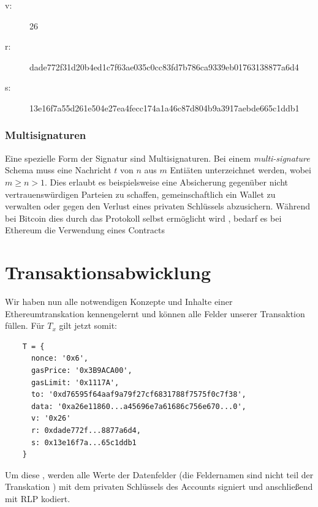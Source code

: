 \documentclass[runningheads]{llncs}
\begin{document}
\begin{description}
  \item[v:] 26
  \item [r:] dade772f31d20b4ed1c7f63ae035c0cc83fd7b786ca9339eb01763138877a6d4
  \item[s:] 13e16f7a55d261e504e27ea4fecc174a1a46c87d804b9a3917aebde665c1ddb1
\end{description}

\subsubsection{Multisignaturen}
Eine spezielle Form der Signatur sind Multisignaturen. Bei einem \textit{multi-signature} Schema muss eine Nachricht $ t $ von $ n $ aus $ m $ Entiäten unterzeichnet werden, wobei $ m \geq n > 1 $. \cite[S. 2]{hutchison_identity-based_2006} Dies erlaubt es beispielsweise eine Absicherung gegenüber nicht vertrauenswürdigen Parteien zu schaffen, gemeinschaftlich ein Wallet zu verwalten oder gegen den Verlust eines privaten Schlüssels abzusichern. Während bei Bitcoin dies durch das Protokoll selbst ermöglicht wird \cite{noauthor_multisignature_nodate}, bedarf es bei Ethereum die Verwendung eines Contracts \cite{noauthor_frequently_nodate}


\section{Transaktionsabwicklung}
Wir haben nun alle notwendigen Konzepte und Inhalte einer Ethereumtranskation kennengelernt und können alle Felder unserer Transaktion füllen. Für $T_x$ gilt jetzt somit:
\begin{center}
  \begin{verbatim}
    T = { 
      nonce: '0x6',
      gasPrice: '0x3B9ACA00',
      gasLimit: '0x1117A',
      to: '0xd76595f64aaf9a79f27cf6831788f7575f0c7f38',
      data: '0xa26e11860...a45696e7a61686c756e670...0',
      v: '0x26'
      r: 0xdade772f...8877a6d4,
      s: 0x13e16f7a...65c1ddb1
    }
  \end{verbatim}
\end{center}

Um diese , werden alle Werte der Datenfelder (die Feldernamen sind nicht teil der Transkation \cite[S. 100]{antonopoulos_mastering_2019}) mit dem privaten Schlüssels des Accounts signiert und anschließend mit RLP kodiert.
\end{document}
